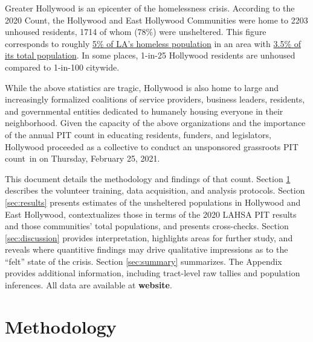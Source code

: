 \documentclass[11pt,twocolumn]{article}
\def\bfr{\bf\color{red}}
\def\Count{count}
\begin{document}
Greater Hollywood is an epicenter of the homelessness crisis. According to the 2020 Count, the 
Hollywood and East Hollywood Communities were home to 2203 unhoused residents, 1714 of whom 
(78\%) were unsheltered. This figure corresponds to roughly 
\href{https://www.lahsa.org/data?id=45-2020-homeless-count-by-community-city}
{5\% of LA's homeless population} in an area with \href{https://geomap.ffiec.gov/FFIECGeocMap/GeocodeMap1.aspx}{3.5\% of its total population}. In some places, 1-in-25 Hollywood residents are 
unhoused compared to 1-in-100 citywide.

While the above statistics are tragic, Hollywood is also home to large and increasingly formalized
coalitions of service providers, business leaders, residents, and governmental entities dedicated to 
humanely housing everyone in their neighborhood. Given the capacity of the above organizations and 
the importance of the annual PIT count in educating residents, funders, and legislators, Hollywood 
proceeded as a collective to conduct an unsponsored grassroots PIT \Count\ in on Thursday, 
February 25, 2021.

This document details the methodology and findings of that \Count. 
Section \ref{sec:procedure} describes the volunteer training, data acquisition, 
and analysis protocols. Section \ref{sec:results} presents estimates of the unsheltered 
populations in Hollywood and East Hollywood, contextualizes those in terms of the 2020 
LAHSA PIT results and those communities' total populations, and presents cross-checks. 
Section \ref{sec:discussion} provides interpretation, highlights areas for further study, and 
reveals where quantitive findings may drive qualitative impressions as to the ``felt'' state of 
the crisis. Section \ref{sec:summary} summarizes. The Appendix provides additional information, 
including tract-level raw tallies and population inferences. All data are available at {\bfr website}.

\section{Methodology}
\label{sec:procedure}
%
%
\end{document}
